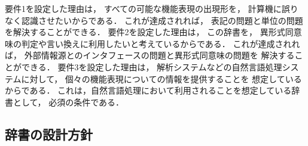 \documentclass[japanese]{jnlp_1.3e}
\begin{document}
要件1を設定した理由は，
すべての可能な機能表現の出現形を，
計算機に誤りなく認識させたいからである．
これが達成されれば，
表記の問題と単位の問題を解決することができる．
要件2を設定した理由は，
この辞書を，
異形式同意味の判定や言い換えに利用したいと考えているからである．
これが達成されれば，
外部情報源とのインタフェースの問題と異形式同意味の問題を
解決することができる．
要件3を設定した理由は，
解析システムなどの自然言語処理システムに対して，
個々の機能表現についての情報を提供することを
想定しているからである．
これは，自然言語処理において利用されることを想定している辞書として，
必須の条件である．

\subsection{辞書の設計方針}
\label{subsec:policy}
\end{document}
